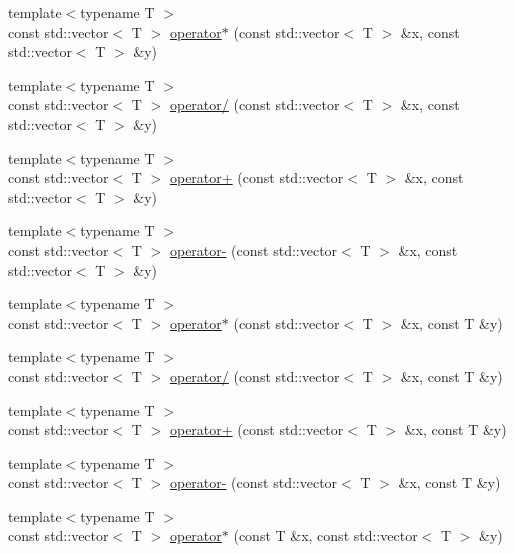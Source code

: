 \begin{DoxyCompactItemize}
\item 
{\footnotesize template$<$typename T $>$ }\\const std\+::vector$<$ T $>$ \hyperlink{namespace_c_o_n_t_r_a_l_i_g_n_af1b254c31a46ad2861442bb2390ee336}{operator$\ast$} (const std\+::vector$<$ T $>$ \&x, const std\+::vector$<$ T $>$ \&y)
\item 
{\footnotesize template$<$typename T $>$ }\\const std\+::vector$<$ T $>$ \hyperlink{namespace_c_o_n_t_r_a_l_i_g_n_abe533e779b3a764b4b7dca6b627c1fed}{operator/} (const std\+::vector$<$ T $>$ \&x, const std\+::vector$<$ T $>$ \&y)
\item 
{\footnotesize template$<$typename T $>$ }\\const std\+::vector$<$ T $>$ \hyperlink{namespace_c_o_n_t_r_a_l_i_g_n_ad37632aa6d04b0b0735dfe1a104a1010}{operator+} (const std\+::vector$<$ T $>$ \&x, const std\+::vector$<$ T $>$ \&y)
\item 
{\footnotesize template$<$typename T $>$ }\\const std\+::vector$<$ T $>$ \hyperlink{namespace_c_o_n_t_r_a_l_i_g_n_a2a3a5dcf2fc4605559fa475cab65c6fe}{operator-\/} (const std\+::vector$<$ T $>$ \&x, const std\+::vector$<$ T $>$ \&y)
\item 
{\footnotesize template$<$typename T $>$ }\\const std\+::vector$<$ T $>$ \hyperlink{namespace_c_o_n_t_r_a_l_i_g_n_ae2d8e5fded025a34e09c65c2dc997dd8}{operator$\ast$} (const std\+::vector$<$ T $>$ \&x, const T \&y)
\item 
{\footnotesize template$<$typename T $>$ }\\const std\+::vector$<$ T $>$ \hyperlink{namespace_c_o_n_t_r_a_l_i_g_n_a2dca0d21c43b77c6ea3f790feb7ec634}{operator/} (const std\+::vector$<$ T $>$ \&x, const T \&y)
\item 
{\footnotesize template$<$typename T $>$ }\\const std\+::vector$<$ T $>$ \hyperlink{namespace_c_o_n_t_r_a_l_i_g_n_ae2222d1e328d2c582c47a729bf9ebf42}{operator+} (const std\+::vector$<$ T $>$ \&x, const T \&y)
\item 
{\footnotesize template$<$typename T $>$ }\\const std\+::vector$<$ T $>$ \hyperlink{namespace_c_o_n_t_r_a_l_i_g_n_a6999f279abf3d94291a284bc5b82546e}{operator-\/} (const std\+::vector$<$ T $>$ \&x, const T \&y)
\item 
{\footnotesize template$<$typename T $>$ }\\const std\+::vector$<$ T $>$ \hyperlink{namespace_c_o_n_t_r_a_l_i_g_n_a8b40f9b1bc2302cfd81508683105dd4f}{operator$\ast$} (const T \&x, const std\+::vector$<$ T $>$ \&y)

\end{DoxyCompactItemize}
